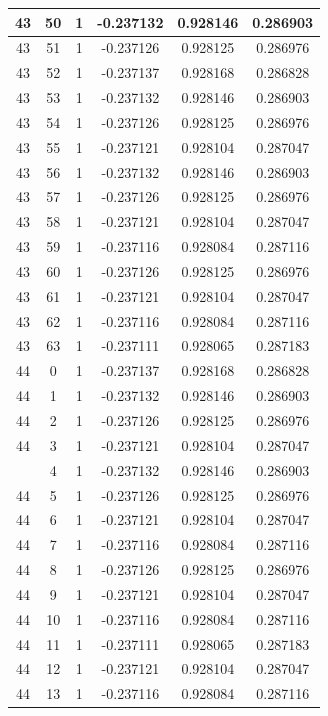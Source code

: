 \documentclass[12pt,a4paper]{article}
\numberwithin{equation}{section}
\numberwithin{figure}{section}
\numberwithin{table}{section}
\begin{document}
\begin{longtable}{|c|c|c|c|c|c|}
43 & 50 & 1 & -0.237132 & 0.928146 & 0.286903 \\ \hline
43 & 51 & 1 & -0.237126 & 0.928125 & 0.286976 \\ \hline
43 & 52 & 1 & -0.237137 & 0.928168 & 0.286828 \\ \hline
43 & 53 & 1 & -0.237132 & 0.928146 & 0.286903 \\ \hline
43 & 54 & 1 & -0.237126 & 0.928125 & 0.286976 \\ \hline
43 & 55 & 1 & -0.237121 & 0.928104 & 0.287047 \\ \hline
43 & 56 & 1 & -0.237132 & 0.928146 & 0.286903 \\ \hline
43 & 57 & 1 & -0.237126 & 0.928125 & 0.286976 \\ \hline
43 & 58 & 1 & -0.237121 & 0.928104 & 0.287047 \\ \hline
43 & 59 & 1 & -0.237116 & 0.928084 & 0.287116 \\ \hline
43 & 60 & 1 & -0.237126 & 0.928125 & 0.286976 \\ \hline
43 & 61 & 1 & -0.237121 & 0.928104 & 0.287047 \\ \hline
43 & 62 & 1 & -0.237116 & 0.928084 & 0.287116 \\ \hline
43 & 63 & 1 & -0.237111 & 0.928065 & 0.287183 \\ \hline
44 & 0 & 1 & -0.237137 & 0.928168 & 0.286828 \\ \hline
44 & 1 & 1 & -0.237132 & 0.928146 & 0.286903 \\ \hline
44 & 2 & 1 & -0.237126 & 0.928125 & 0.286976 \\ \hline
44 & 3 & 1 & -0.237121 & 0.928104 & 0.287047 \\ \hline
\pagebreak
44 & 4 & 1 & -0.237132 & 0.928146 & 0.286903 \\ \hline
44 & 5 & 1 & -0.237126 & 0.928125 & 0.286976 \\ \hline
44 & 6 & 1 & -0.237121 & 0.928104 & 0.287047 \\ \hline
44 & 7 & 1 & -0.237116 & 0.928084 & 0.287116 \\ \hline
44 & 8 & 1 & -0.237126 & 0.928125 & 0.286976 \\ \hline
44 & 9 & 1 & -0.237121 & 0.928104 & 0.287047 \\ \hline
44 & 10 & 1 & -0.237116 & 0.928084 & 0.287116 \\ \hline
44 & 11 & 1 & -0.237111 & 0.928065 & 0.287183 \\ \hline
44 & 12 & 1 & -0.237121 & 0.928104 & 0.287047 \\ \hline
44 & 13 & 1 & -0.237116 & 0.928084 & 0.287116 \\ \hline

\end{longtable}
\end{document}
